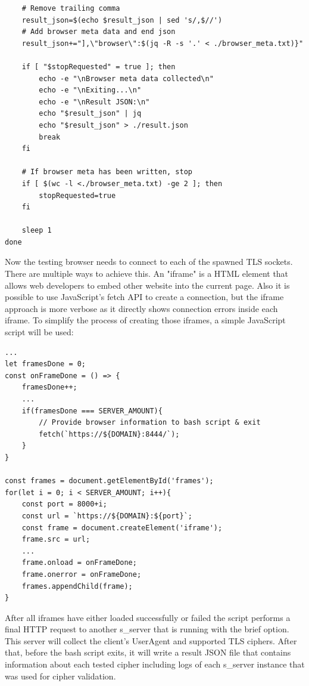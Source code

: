 \documentclass[12pt]{scrbook}
\begin{document}
\begin{verbatim}
    # Remove trailing comma
    result_json=$(echo $result_json | sed 's/,$//')
    # Add browser meta data and end json
    result_json+="],\"browser\":$(jq -R -s '.' < ./browser_meta.txt)}"

    if [ "$stopRequested" = true ]; then
        echo -e "\nBrowser meta data collected\n"
        echo -e "\nExiting...\n"
        echo -e "\nResult JSON:\n"
        echo "$result_json" | jq
        echo "$result_json" > ./result.json
        break
    fi

    # If browser meta has been written, stop
    if [ $(wc -l <./browser_meta.txt) -ge 2 ]; then
        stopRequested=true
    fi

    sleep 1
done
\end{verbatim}

\newpage

Now the testing browser needs to connect to each of the spawned TLS sockets.
There are multiple ways to achieve this.
An "iframe" is a HTML element that allows web developers to embed other website
into the current page. Also it is possible to use JavaScript's fetch API to create a connection, but the iframe approach is
more verbose as it directly shows connection errors inside each iframe. To simplify the process of creating those
iframes, a simple JavaScript script will be used:

\begin{verbatim}
...
let framesDone = 0;
const onFrameDone = () => {
    framesDone++;
    ...
    if(framesDone === SERVER_AMOUNT){
        // Provide browser information to bash script & exit
        fetch(`https://${DOMAIN}:8444/`);
    }
}

const frames = document.getElementById('frames');
for(let i = 0; i < SERVER_AMOUNT; i++){
    const port = 8000+i;
    const url = `https://${DOMAIN}:${port}`;
    const frame = document.createElement('iframe');
    frame.src = url;
    ...
    frame.onload = onFrameDone;
    frame.onerror = onFrameDone;
    frames.appendChild(frame);
}
\end{verbatim}

After all iframes have either loaded successfully or failed the script performs
a final HTTP request to another s\_server that is running with the \-brief option.
This server will collect the client's User\-Agent and supported TLS ciphers.
After that, before the bash script exits, it will write a result JSON file that
contains information about each tested cipher including logs
of each s\_server instance that was used for cipher validation.
\end{document}

